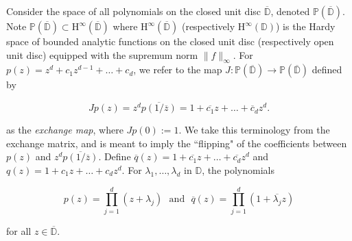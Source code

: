 \documentclass[10pt, reqno]{amsart}
\newtheorem{lemma}[theorem]{Lemma}
\theoremstyle{definition}
\numberwithin{equation}{section}
\begin{document}


Consider the space of all polynomials on the closed unit disc $\overline{\mathbb{D}}$, denoted $\mathbb{P}(\overline{\mathbb{D}})$. Note $\mathbb{P}(\overline{\mathbb{D}})\subset \mathrm{H}^{\infty}(\overline{\mathbb{D}})$ where $\mathrm{H}^{\infty}(\overline{\mathbb{D}})$ (respectively $\mathrm{H}^{\infty}(\mathbb{D})$) is the Hardy space of bounded analytic functions on the closed unit disc (respectively open unit disc) equipped with the supremum norm $\| f \|_{\infty}$. For $p(z) = z^{d}+c_{1}z^{d-1}+\hdots+c_{d}$, we refer to the map $J:\mathbb{P}(\overline{\mathbb{D}})\rightarrow\mathbb{P}(\overline{\mathbb{D}})$ defined by

\begin{equation}\label{exchange}
Jp(z)= z^{d}\overline{p(1/\overline{z})} = 1+\overline{c_{1}}z+\hdots+\overline{c}_{d}z^{d}.
\end{equation}

\noindent as the {\it{exchange map}}, where $Jp(0):=1$. We take this terminology from the exchange matrix, and is meant to imply the ``flipping" of the coefficients between $p(z)$ and $z^{d}\overline{p(1/\overline{z})}$. Define $\overline{q}(z) = 1+\overline{c_{1}}z+\hdots+\overline{c_{d}}z^{d}$ and $q(z) = 1+c_{1}z+\hdots+c_{d}z^{d}$. For $\lambda_{1},\hdots,\lambda_{d}$ in $\mathbb{D}$, the polynomials 

\begin{equation}\label{factorisation}
    p(z) = \prod_{j=1}^{d}(z+\lambda_{j})~~~\text{and}~~~\overline{q}(z)=\prod_{j=1}^{d}(1+\overline{\lambda_{j}}z)
\end{equation}

\noindent for all $z\in\overline{\mathbb{D}}$. 


\end{document}
